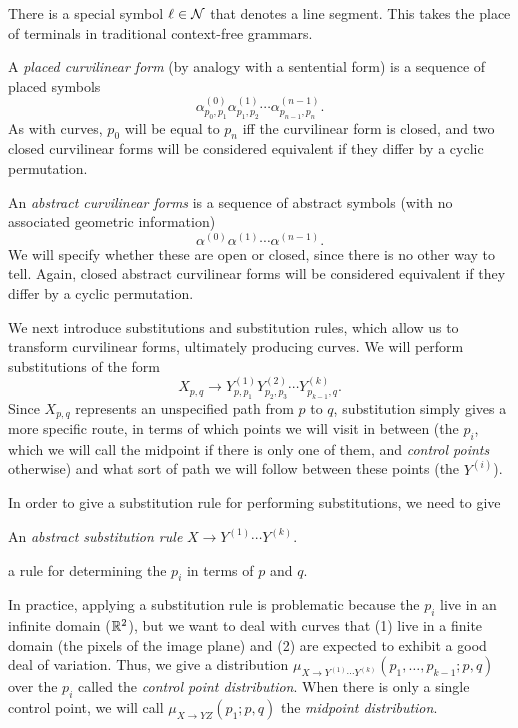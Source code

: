 \documentclass{article}
\begin{document}
There is a special symbol $\ell\in {\mathcal N}$ that denotes a line
segment. This takes the place of terminals in traditional context-free
grammars.

\begin{defn}
A {\em placed curvilinear form} (by analogy with a sentential form) is
a sequence of placed symbols
$$ \alpha^{(0)}_{p_0,p_1} \alpha^{(1)}_{p_1,p_2} \cdots
\alpha^{(n-1)}_{p_{n-1},{p_n}}.$$ As with curves, $p_0$ will be equal
to $p_n$ iff the curvilinear form is closed, and two closed curvilinear
forms will be considered equivalent if they differ by a cyclic
permutation.

An {\em abstract curvilinear forms} is a sequence of abstract symbols
(with no associated geometric information)
$$ \alpha^{(0)} \alpha^{(1)} \cdots \alpha^{(n-1)}.$$ We will specify
whether these are open or closed, since there is no other way to
tell. Again, closed abstract curvilinear forms will be considered
equivalent if they differ by a cyclic permutation.
\end{defn}

We next introduce substitutions and substitution rules, which allow us
to transform curvilinear forms, ultimately producing curves. We will
perform substitutions of the form
$$ X_{p,q} \to Y^{(1)}_{p,p_1} Y^{(2)}_{p_2,p_3} \cdots
Y^{(k)}_{p_{k-1},q}.$$ Since $X_{p,q}$ represents an unspecified path
from $p$ to $q$, substitution simply gives a more specific route, in
terms of which points we will visit in between (the $p_i$, which we
will call the midpoint if there is only one of them, and {\em control
  points} otherwise) and what sort of path we will follow between
these points (the $Y^{(i)}$).

In order to give a substitution rule for performing substitutions, we
need to give
\bitem
\item An {\em abstract substitution rule} $X\to Y^{(1)}\cdots Y^{(k)}$.
\item a rule for determining the $p_i$ in terms of $p$ and $q$.
\eitem

In practice, applying a substitution rule is problematic because the
$p_i$ live in an infinite domain ($\mathbb{R}^2$), but we want to deal with
curves that (1) live in a finite domain (the pixels of the image
plane) and (2) are expected to exhibit a good deal of variation. Thus,
we give a distribution $\mu_{X\to Y^{(1)}\cdots Y^{(k)}}(p_1,\dots,
p_{k-1} ; p,q)$ over the $p_i$ called the {\em control point distribution}. 
When there is only a single control point, we will call $\mu_{X\to
YZ}(p_1; p,q)$ the {\em midpoint distribution}.
\end{document}
